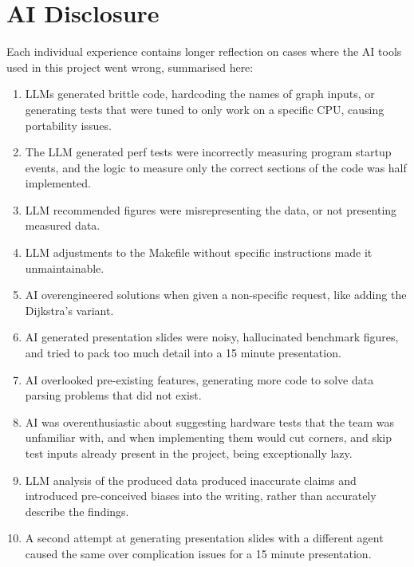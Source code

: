 \section{AI Disclosure}

Each individual experience contains longer reflection on cases where the AI
tools used in this project went wrong, summarised here:
\begin{enumerate}
	\item [Oscar]
		LLMs generated brittle code, hardcoding the names of graph inputs, or
		generating tests that were tuned to only work on a specific CPU, causing
		portability issues.

	\item [Oscar]
		The LLM generated perf tests were incorrectly measuring program startup
		events, and the logic to measure only the correct sections of the code was
		half implemented.

	\item [Oscar]
		LLM recommended figures were misrepresenting the data, or not presenting
		measured data.

	\item [Oscar]
		LLM adjustments to the Makefile without specific instructions made it
		unmaintainable.

	\item [Giang]
		AI overengineered solutions when given a non-specific request, like adding
		the  Dijkstra's variant.

	\item [Giang]
		AI generated presentation slides were noisy, hallucinated benchmark figures,
		and tried to pack too much detail into a 15 minute presentation.

	\item [Giang]
		AI overlooked pre-existing features, generating more code to solve data parsing
		problems that did not exist.

	\item [Tung]
		AI was overenthusiastic about suggesting hardware tests that the team was
		unfamiliar with, and when implementing them would cut corners, and skip test
		inputs already present in the project, being exceptionally lazy.

	\item [Tung]
		LLM analysis of the produced data produced inaccurate claims and introduced
		pre-conceived biases into the writing, rather than accurately describe the
		findings.

	\item [Tung]
		A second attempt at generating presentation slides with a different agent
		caused the same over complication issues for a 15 minute presentation.

\end{enumerate}

